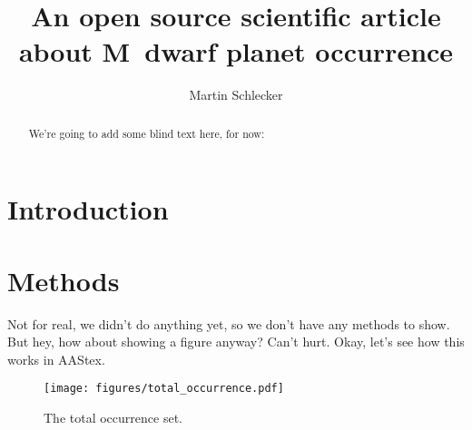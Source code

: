 \documentclass[twocolumn]{aastex631}
\begin{document}
\title{An open source scientific article about M~dwarf planet occurrence}

\author[0000-0000-0000-0000]{Martin Schlecker}

\begin{abstract}
    We're going to add some blind text here, for now:
    \blindtext
\end{abstract}

\section{Introduction}
\Blindtext[4]


\section{Methods}
   Not for real, we didn't do anything yet, so we don't have any methods to show.
    But hey, how about showing a figure anyway?
    Can't hurt. Okay, let's see how this works in AAStex.
\begin{figure}
    \begin{centering}
        \texttt{[image: figures/total\_occurrence.pdf]}
        \caption{The total occurrence set.}
        \label{fig:total_occurrence}
    \end{centering}
\end{figure}
\end{document}
